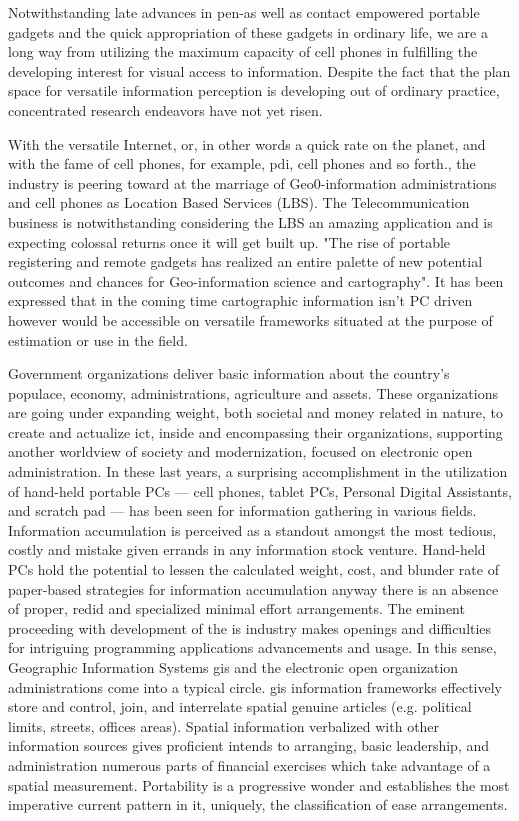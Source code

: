 Notwithstanding late advances in pen-as well as contact empowered portable gadgets and the quick appropriation of these gadgets in ordinary life, we are a long way from utilizing the maximum capacity of cell phones in fulfilling the developing interest for visual access to information. Despite the fact that the plan space for versatile  information perception is developing out of ordinary practice, concentrated research endeavors have not yet risen.

With the versatile Internet, or, in other words a quick rate on the planet, and with the fame of cell phones, for example, \gls{pdi}, cell phones and so forth., the industry is peering toward at the marriage of Geo0-information administrations and cell phones as Location Based Services (LBS). The Telecommunication business is notwithstanding considering the LBS an amazing application and is expecting colossal returns once it will get built up. "The rise of portable registering and remote gadgets has realized an entire palette of new potential outcomes and chances for Geo-information science and cartography". It has been expressed that in the coming time cartographic information isn't PC driven however would be accessible on versatile frameworks situated at the purpose of estimation or use in the field.


Government organizations deliver basic information about the country's populace, economy, administrations, agriculture and assets. These organizations are going under expanding weight, both societal and money related in nature, to create and actualize \gls{ict}, inside and encompassing their organizations, supporting another worldview of society and modernization, focused on electronic open administration. In these last years, a surprising accomplishment in the utilization of hand-held portable PCs — cell phones, tablet PCs, Personal Digital Assistants, and scratch pad — has been seen for information gathering in various fields.
Information accumulation is perceived as a standout amongst the most tedious, costly and mistake given errands in any information stock venture. Hand-held PCs hold the potential to lessen the calculated weight, cost, and blunder rate of paper-based strategies for information accumulation anyway there is an absence of proper, redid and specialized minimal effort arrangements. The eminent proceeding with development of the \gls{is} industry makes openings and difficulties for intriguing programming applications advancements and usage. In this sense, Geographic Information Systems \gls{gis} and the electronic open organization administrations come into a typical circle. \gls{gis} information frameworks effectively store and control, join, and interrelate spatial genuine articles (e.g. political limits, streets, offices areas). Spatial information verbalized with other information sources gives proficient intends to arranging, basic leadership, and administration numerous parts of financial exercises which take advantage of a spatial measurement. Portability is a progressive wonder and establishes the most imperative current pattern in \gls{it}, uniquely, the classification of ease arrangements.

